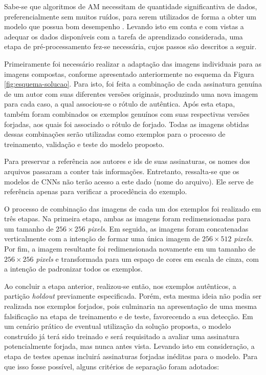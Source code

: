 
Sabe-se que algoritmos de AM necessitam de quantidade significantiva de dados, preferencialmente sem muitos ruídos, para serem utilizados de forma a obter um modelo que possua bom desempenho \cite{marsland}. Levando isto em conta e com vistas a adequar os dados disponíveis com a tarefa de aprendizado considerada, uma etapa de pré-processamento fez-se necessária, cujos passos são descritos a seguir.

Primeiramente foi necessário realizar a adaptação das imagens individuais para as imagens compostas, conforme apresentado anteriormente no esquema da Figura \ref{fig:esquema-solucao}. Para isto, foi feita a combinação de cada assinatura genuína de um autor com suas diferentes versões originais, produzindo uma nova imagem para cada caso, a qual associou-se o rótulo de autêntica. Após esta etapa, também foram combinados os exemplos genuínos com suas respectivas versões forjadas, aos quais foi associado o rótulo de forjado. Todas as imagens obtidas dessas combinações serão utilizadas como exemplos para o processo de treinamento, validação e teste do modelo proposto.

Para preservar a referência aos autores e ids de suas assinaturas, os nomes dos arquivos passaram a conter tais informações. Entretanto, ressalta-se que os modelos de CNNs não terão acesso a este dado (nome do arquivo). Ele serve de referência apenas para verificar a procedência do exemplo.

O processo de combinação das imagens de cada um dos exemplos foi realizado em três etapas. Na primeira etapa, ambas as imagens foram redimensionadas para um tamanho de $256 \times 256$ \emph{pixels}. Em seguida, as imagens foram concatenadas verticalmente com a intenção de formar uma única imagem de $256 \times 512$ \emph{pixels}. Por fim, a imagem resultante foi redimensionada novamente em um tamanho de $256 \times 256$ \emph{pixels} e transformada para um espaço de cores em escala de cinza, com a intenção de padronizar todos os exemplos.

Ao concluir a etapa anterior, realizou-se então, nos exemplos autênticos, a partição \emph{holdout} previamente especificada. Porém, esta mesma ideia não podia ser realizada nos exemplos forjados, pois culminaria na apresentação de uma mesma falsificação na etapa de treinamento e de teste, favorecendo a sua detecção. Em um cenário prático de eventual utilização da solução proposta, o modelo construído já terá sido treinado e será requisitado a avaliar uma assinatura potencialmente forjada, mas nunca antes vista. Levando isto em consideração, a etapa de testes apenas incluirá assinaturas forjadas inéditas para o modelo. Para que isso fosse possível, alguns critérios de separação foram adotados:

